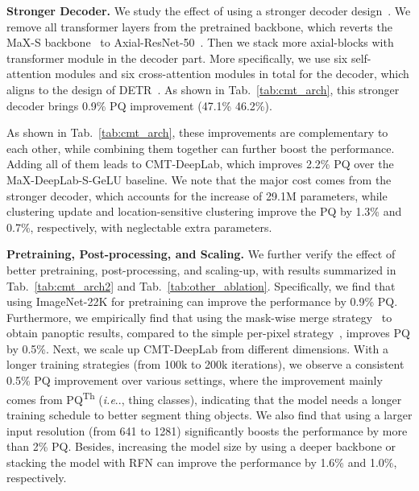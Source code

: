 \documentclass[10pt,twocolumn,letterpaper]{article}
\makeatletter
\DeclareRobustCommand\onedot{\futurelet\@let@token\@onedot}
\def\@onedot{\ifx\@let@token.\else.\null\fi\xspace}
\def\ie{\emph{i.e}\onedot} \def\Ie{\emph{I.e}\onedot}
\makeatother
\begin{document}
\vspace{0.5ex}
\noindent\textbf{Stronger Decoder.} We study the effect of using a stronger decoder design~\cite{carion2020end,cheng2021per}. We remove all transformer layers from the pretrained backbone, which reverts the MaX-S backbone~\cite{wang2021max} to Axial-ResNet-50~\cite{wang2020axial}. Then we stack more axial-blocks with transformer module in the decoder part. More specifically, we use six self-attention modules and six cross-attention modules in total for the decoder, which aligns to the design of DETR~\cite{carion2020end}. As shown in Tab.~\ref{tab:cmt_arch}, this stronger decoder brings 0.9\% PQ improvement (47.1\%  46.2\%).

As shown in Tab.~\ref{tab:cmt_arch}, these improvements are complementary to each other, while combining them together can further boost the performance. Adding all of them leads to CMT-DeepLab, which improves 2.2\% PQ over the MaX-DeepLab-S-GeLU baseline. We note that the major cost comes from the stronger decoder, which accounts for the increase of 29.1M parameters, while clustering update and location-sensitive clustering improve the PQ by 1.3\% and 0.7\%, respectively, with neglectable extra parameters.

\vspace{0.5ex}
\noindent\textbf{Pretraining, Post-processing, and Scaling.} We further verify the effect of better pretraining, post-processing, and scaling-up, with results summarized in Tab.~\ref{tab:cmt_arch2} and Tab.~\ref{tab:other_ablation}. Specifically, we find that using ImageNet-22K for pretraining can improve the performance by 0.9\% PQ. Furthermore, we empirically find that using the mask-wise merge strategy~\cite{cheng2021per} to obtain panoptic results, compared to the simple per-pixel strategy~\cite{wang2021max}, improves PQ by 0.5\%.
Next, we scale up CMT-DeepLab from different dimensions. With a longer training strategies (from 100k to 200k iterations), we observe a consistent 0.5\% PQ improvement over various settings, where the improvement mainly comes from PQ\textsuperscript{Th} (\ie, thing classes), indicating that the model needs a longer training schedule to better segment thing objects. We also find that using a larger input resolution (from 641 to 1281) significantly boosts the performance by more than 2\% PQ. Besides, increasing the model size by using a deeper backbone or stacking the model with RFN can improve the performance by 1.6\% and 1.0\%, respectively.
\end{document}
